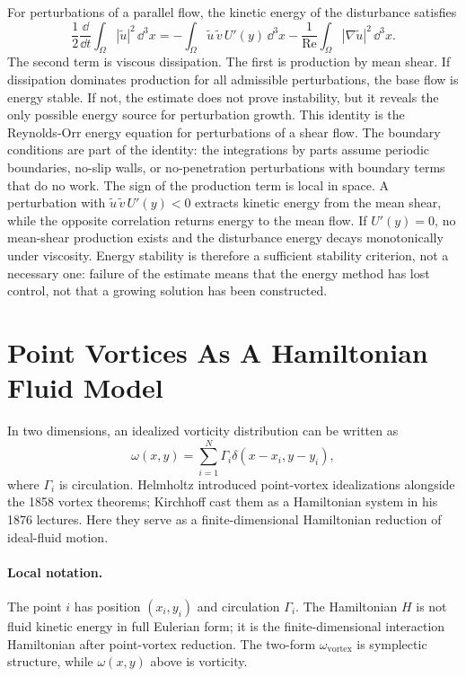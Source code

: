 For perturbations of a parallel flow, the kinetic energy of the disturbance
satisfies
\[
  \frac12\frac{\dd}{\dd t}\int_\Omega |\tilde u|^2\,\dd^3x
  =
  -\int_\Omega \tilde u\,\tilde v\,U'(y)\,\dd^3x
  -
  \frac1{\mathrm{Re}}
  \int_\Omega |\nabla\tilde u|^2\,\dd^3x.
\]
The second term is viscous dissipation. The first is production by mean shear.
If dissipation dominates production for all admissible perturbations, the base
flow is energy stable. If not, the estimate does not prove instability, but it
reveals the only possible energy source for perturbation growth. This identity
is the Reynolds-Orr energy equation for perturbations of a shear flow.
The boundary conditions are part of the identity: the integrations by parts
assume periodic boundaries, no-slip walls, or no-penetration perturbations with
boundary terms that do no work.  The sign of the production term is local in
space.  A perturbation with \(\tilde u\,\tilde v\,U'(y)<0\) extracts kinetic
energy from the mean shear, while the opposite correlation returns energy to
the mean flow.  If \(U'(y)=0\), no mean-shear production exists and the
disturbance energy decays monotonically under viscosity.  Energy stability is
therefore a sufficient stability criterion, not a necessary one: failure of the
estimate means that the energy method has lost control, not that a growing
solution has been constructed.

\section{Point Vortices As A Hamiltonian Fluid Model}
\label{sec:point-vortices}

In two dimensions, an idealized vorticity distribution can be written as
\[
  \omega(x,y)=\sum_{i=1}^{N}\Gamma_i\delta(x-x_i,y-y_i),
\]
where \(\Gamma_i\) is circulation. Helmholtz introduced point-vortex
idealizations alongside the 1858 vortex theorems; Kirchhoff cast them as a
Hamiltonian system in his 1876 lectures.
Here they serve as a finite-dimensional Hamiltonian reduction of ideal-fluid
motion.

\paragraph{Local notation.}
The point \(i\) has position \((x_i,y_i)\) and circulation \(\Gamma_i\).  The
Hamiltonian \(H\) is not fluid kinetic energy in full Eulerian form; it is the
finite-dimensional interaction Hamiltonian after point-vortex reduction.  The
two-form \(\omega_{\mathrm{vortex}}\) is symplectic structure, while
\(\omega(x,y)\) above is vorticity.

